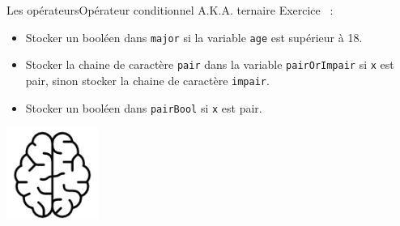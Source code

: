 \documentclass{beamer}
\begin{document}
    \begin{frame}{Les opérateurs}{Opérateur conditionnel A.K.A. ternaire}
        Exercice \execcounterdispinc{}~:
        \begin{itemize}
            \item Stocker un booléen dans \lstinline{major} si la variable \lstinline{age} est
            supérieur à 18.
            \item Stocker la chaine de caractère
            \lstinline{pair} dans la variable \lstinline{pairOrImpair} si
            \lstinline{x} est pair, sinon stocker la chaine de caractère \lstinline{impair}.
            \item Stocker un booléen dans \lstinline{pairBool} si \lstinline{x} est pair.
        \end{itemize}
        \bigbreak
        \centering
        \includegraphics[width=3cm]{image/intelligence}
    \end{frame}
\end{document}
